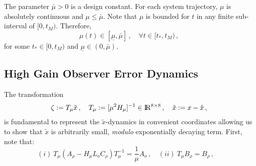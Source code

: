 \documentclass[letterpaper, 10 pt, conference]{ieeeconf}  %
\def\re{{\rm I}\! {\rm R}}
\theoremstyle{plain}
\theoremstyle{definition}
\theoremstyle{remark}
\begin{document}
The parameter $\bar{\mu}\!>\!0$ is a design constant. For each
system trajectory, $\mu$ is absolutely continuous and
$\mu\!\leq\!\bar{\mu}$. Note that $\mu$ is bounded for $t$ in any
finite sub-interval of $[0,t_M)$. Therefore,
%
\begin{equation}
\mu(t)\in[\underline{\mu},\bar{\mu}]\,, \quad \forall
t\!\in\![t_*,t_M)\,, \label{eq:P3}
\end{equation}
%
for some $t_* \in [0,t_M)$ and
$\underline{\mu}\!\in\!(0,\bar{\mu})$. 



\subsection{High Gain Observer Error Dynamics}

The transformation \cite{OK:97}
%
\begin{equation}
\zeta:=T_{\mu}\tilde{x}\,, \quad T_\mu:=[\mu^2
H_\mu]^{-1} \in \re^{8 \times 8}\,, \quad \tilde{x}:= x-\hat{x}\,,\label{eq:defT_HGO}
\end{equation}
%
is fundamental to represent the $\tilde{x}$-dynamics in 
convenient coordinates allowing us to show that $\tilde{x}$ is
arbitrarily small, {\em modulo} exponentially decaying term. First,
note that:
%
$$(i) \ T_\mu(A_\rho-H_\mu L_o
C_\rho)T_\mu^{-1}\!=\!\frac{1}{\mu}A_o\,, \quad (ii) \ T_\mu B_\rho\!=\!B_\rho\,, \quad$$ 
\end{document}
